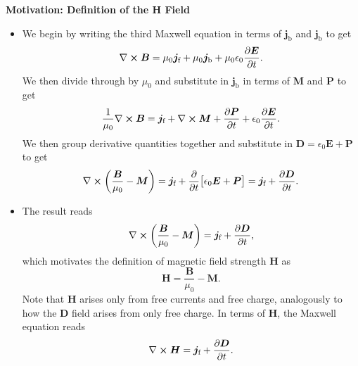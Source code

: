 \documentclass[11pt, a4paper]{article}
\renewcommand{\vec}[1]{\bm{#1}} %
\newcommand{\E}{\vec{E}} %
\newcommand{\D}{\vec{D}}  %
\newcommand{\B}{\vec{B}} %
\renewcommand{\H}{\vec{H}}  %
\renewcommand{\P}{\vec{P}}  %
\newcommand{\M}{\vec{M}}  %
\newcommand{\ee}{\epsilon_{0}}  %
\newcommand{\mm}{\mu_{0}}  %
\renewcommand{\j}{\vec{j}}  %
\renewcommand{\curl}{\nabla \cross}
\begin{document}
\textbf{Motivation: Definition of the $ \H $ Field}
\begin{itemize}
    
    \item We begin by writing the third Maxwell equation in terms of $ \j_{\text{b}} $ and $ \j_{\text{b}} $ to get
    \begin{equation*}
        \curl \B = \mm \j_{\text{f}} + \mm \j_{\text{b}} + \mm \ee \pdv{\E}{t}.
    \end{equation*}
    We then divide through by $ \mm $ and substitute in $ \j_{\text{b}} $ in terms of $ \M $ and $ \P $ to get
    \begin{equation*}
        \frac{1}{\mm} \curl \B = \j_{\text{f}} + \curl \M + \pdv{\P}{t} + \ee \pdv{\E}{t}.
    \end{equation*}
    We then group derivative quantities together and substitute in $ \D = \ee \E + \P $ to get
    \begin{equation*}
        \curl \left( \frac{\B}{\mm} - \M \right) = \j_{\text{f}} + \pdv{t}\big[ \ee \E + \P \big] = \j_{\text{f}} + \pdv{\D}{t}.
    \end{equation*}
    
    \item The result reads
	\begin{equation*}
		\curl \left(\frac{\B}{\mm} - \M\right) = \j_{\text{f}} + \pdv{\D}{t},
	\end{equation*}
    which motivates the definition of magnetic field strength $ \H $ as
	\begin{equation*}
		\H = \frac{\B}{\mm} - \M.
	\end{equation*}
	Note that $ \H $ arises only from free currents and free charge, analogously to how the $ \D $ field arises from only free charge. In terms of $ \H $, the Maxwell equation reads
	\begin{equation*}
		\curl \H = \j_{\text{f}} + \pdv{\D}{t}.
	\end{equation*}
\end{itemize}
\end{document}
